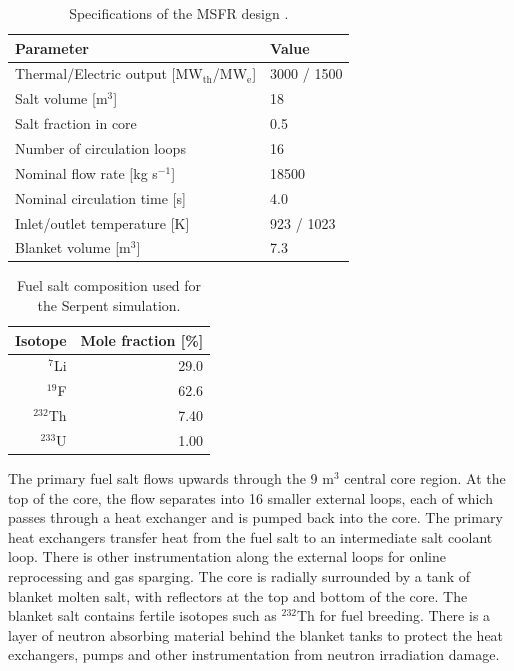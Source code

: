 \documentclass{anstrans}
\begin{document}
\begin{table}[t]
	\caption{Specifications of the \gls{MSFR} design \cite{serp_molten_2014}.}
	\begin{tabular}{ l l }
		\hline
		Parameter & Value \\
		\hline
		Thermal/Electric output [MW$_{\text{th}}$/MW$_{\text{e}}$] & 3000 /
		1500 
		\\
		Salt volume [m$^3$] & 18 \\
		Salt fraction in core & 0.5 \\
		Number of circulation loops & 16 \\
		Nominal flow rate [kg s$^{-1}$] & 18500  \\
		Nominal circulation time [s] & 4.0 \\
		Inlet/outlet temperature [K] & 923 / 1023 \\
		Blanket volume [m$^3$] & 7.3\\
		\hline
	\end{tabular}
	\label{table:msfr}
\end{table}

\begin{table}[t]
\centering
\captionsetup{justification=centering}
\caption{Fuel salt composition used for the Serpent simulation.}
\begin{tabular}{rr}
\hline
{Isotope} & {Mole fraction [\%]}\\
\hline
$^7$Li & 29.0\\
$^{19}$F & 62.6\\
$^{232}$Th & 7.40\\
$^{233}$U & 1.00\\
\hline
\end{tabular}
\label{table:fuelsalt}
\end{table}

	The primary fuel salt flows upwards through the 9 m$^3$ central core
	region. At the top of the core, the flow separates into 16 smaller external
	loops, each of which passes through a heat exchanger and is pumped back
	into the core. The primary heat exchangers transfer heat from the fuel salt 
	to an intermediate salt coolant loop. There is other instrumentation along
	the external loops for online reprocessing and gas sparging. The core is
	radially surrounded by a tank of blanket molten salt, with reflectors at
	the top and bottom of the core. The blanket salt contains fertile isotopes
	such as $^{232}$Th for fuel breeding. There is a layer of neutron absorbing
	material behind the blanket tanks to protect the heat exchangers, pumps and
	other instrumentation from neutron irradiation damage.
\end{document}
